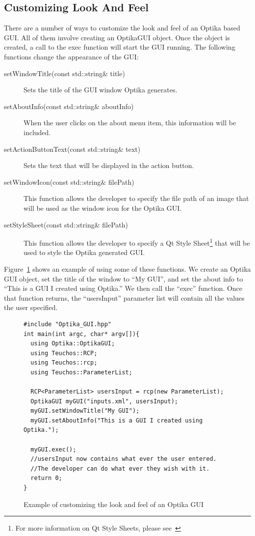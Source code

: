 \subsection{Customizing Look And Feel}
There are a number of ways to customize the look and feel of an Optika based GUI. All of them involve creating an OptikaGUI object. Once the object is created, a call to the
exec function will start the GUI running. The following functions change the appearance of the GUI:
\begin{description}
\item[setWindowTitle(const std::string\& title)] Sets the title of the GUI window Optika generates.
\item[setAboutInfo(const std::string\& aboutInfo)] When the user clicks on the about menu item, this information will be included.
\item[setActionButtonText(const std::string\& text)] Sets the text that will be displayed in the action button.
\item[setWindowIcon(const std::string\& filePath)] This function allows the developer to specify the file path of an image that will be used as the window icon for the 
Optika GUI.
\item[setStyleSheet(const std::string\& filePath)] This function allows the developer to specify a Qt Style Sheet\footnote{For more information on Qt Style Sheets, please 
see~\cite{QtStyle}} that will be used to style the Optika generated GUI.
\end{description}

Figure~\ref{lookGui} shows an example of using some of these functions. We create an Optika GUI object, set the title of the window to ``My GUI'', and set the
about info to ``This is a GUI I created using Optika.'' We then call the ``exec'' function. Once that function returns, the ``usersInput'' parameter list will contain all 
the values the user specified.
\begin{figure}
\centering
{\footnotesize
\begin{Verbatim}
#include "Optika_GUI.hpp"
int main(int argc, char* argv[]){
  using Optika::OptikaGUI;
  using Teuchos::RCP;
  using Teuchos::rcp;
  using Teuchos::ParameterList;

  RCP<ParameterList> usersInput = rcp(new ParameterList);
  OptikaGUI myGUI("inputs.xml", usersInput);
  myGUI.setWindowTitle("My GUI");
  myGUI.setAboutInfo("This is a GUI I created using Optika.");

  myGUI.exec();
  //usersInput now contains what ever the user entered.
  //The developer can do what ever they wish with it.
  return 0;
}
\end{Verbatim}
}
\caption{Example of customizing the look and feel of an Optika GUI}
\label{lookGui}
\end{figure}

